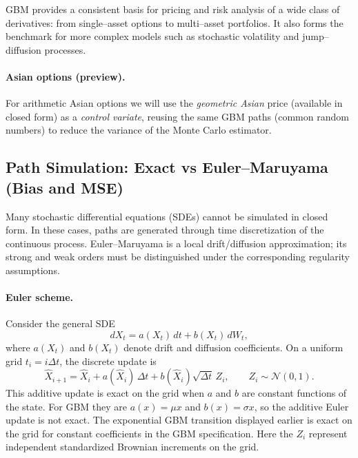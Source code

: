 \begin{remark}[Applications]
GBM provides a consistent basis for pricing and risk analysis of a wide class of derivatives:  
from single--asset options to multi--asset portfolios.  
It also forms the benchmark for more complex models such as stochastic volatility and jump--diffusion processes.
\end{remark}

\paragraph{Asian options (preview).}
For arithmetic Asian options we will use the \emph{geometric Asian} price (available in closed form) as a \emph{control variate}, reusing the same GBM paths (common random numbers) to reduce the variance of the Monte Carlo estimator.
\subsection{Path Simulation: Exact vs Euler--Maruyama (Bias and MSE)} 
\label{sec:disc}

Many stochastic differential equations (SDEs) cannot be simulated in closed form.  
In these cases, paths are generated through time discretization of the continuous process.  
Euler--Maruyama is a local drift/diffusion approximation; its
strong and weak orders must be distinguished under the corresponding
regularity assumptions.

\paragraph{Euler scheme.}
Consider the general SDE
\[
dX_t = a(X_t)\,dt + b(X_t)\,dW_t,
\]
where \(a(X_t)\) and \(b(X_t)\) denote drift and diffusion coefficients.  
On a uniform grid \(t_i = i\Delta t\), the discrete update is
\[
\widehat{X}_{i+1} = \widehat{X}_i + a(\widehat{X}_i)\,\Delta t
+ b(\widehat{X}_i)\sqrt{\Delta t}\,Z_i, \qquad Z_i\sim\mathcal N(0,1).
\]
This additive update is exact on the grid when $a$ and $b$ are
constant functions of the state. For GBM they are $a(x)=\mu x$ and
$b(x)=\sigma x$, so the additive Euler update is not exact. The
exponential GBM transition displayed earlier is exact on the grid for
constant coefficients in the GBM specification. Here the $Z_i$ represent independent
standardized Brownian increments on the grid.

